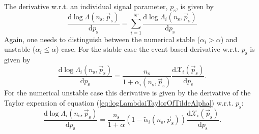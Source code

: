 \documentclass{article}
\newcommand{\ns}{n_{\mathrm{s}}}
\newcommand{\ps}{\vec{p}_{\mathrm{s}}}
\begin{document}
The derivative w.r.t. an individual signal parameter, $p_{\mathrm{s}}$, is given by
\begin{equation}
 \frac{\mathrm{d} \log \Lambda(\ns,\ps)}{\mathrm{d} p_{\mathrm{s}}} = \sum_{i=1}^{N'} \frac{\mathrm{d}\log\Lambda_i(\ns,\ps)}{\mathrm{d}p_{\mathrm{s}}}
\end{equation}
Again, one needs to distinguish between the numerical stable ($\alpha_i > \alpha$)
and unstable ($\alpha_i \leq \alpha$) case.
For the stable case the event-based derivative w.r.t. $p_{\mathrm{s}}$ is given by
\begin{equation}
 \frac{\mathrm{d}\log\Lambda_i(\ns,\ps)}{\mathrm{d}p_{\mathrm{s}}} = \frac{\ns}{1+\alpha_i(\ns,\ps)} \frac{\mathrm{d}\mathcal{X}_i(\ps)}{\mathrm{d}p_{\mathrm{s}}}.
\end{equation}
For the numerical unstable case this derivative is
given by the derivative of the Taylor expension of equation (\ref{eq:logLambdaiTaylorOfTildeAlpha})
w.r.t. $p_{\mathrm{s}}$:
\begin{equation}
 \frac{\mathrm{d}\log\Lambda_i(\ns,\ps)}{\mathrm{d}p_{\mathrm{s}}} = \frac{\ns}{1+\alpha}\left(1 - \tilde{\alpha}_i(\ns,\ps)\right) \frac{\mathrm{d}\mathcal{X}_i(\ps)}{\mathrm{d}p_{\mathrm{s}}}.
\end{equation}
\end{document}
